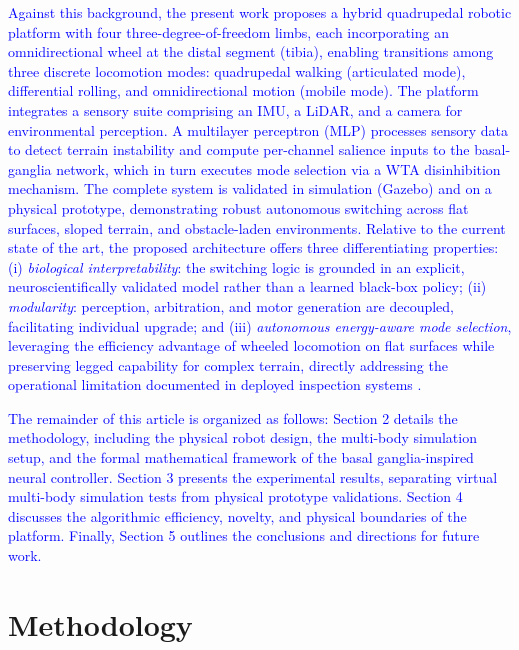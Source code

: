 \documentclass[preprint,12pt]{elsarticle}
\newcommand{\revblue}[1]{\textcolor{blue}{#1}}
\begin{document}
\revblue{Against this background, the present work proposes a hybrid quadrupedal robotic platform with four three-degree-of-freedom limbs, each incorporating an omnidirectional wheel at the distal segment (tibia), enabling transitions among three discrete locomotion modes: quadrupedal walking (articulated mode), differential rolling, and omnidirectional motion (mobile mode). The platform integrates a sensory suite comprising an IMU, a LiDAR, and a camera for environmental perception. A multilayer perceptron (MLP) processes sensory data to detect terrain instability and compute per-channel salience inputs to the basal-ganglia network, which in turn executes mode selection via a WTA disinhibition mechanism. The complete system is validated in simulation (Gazebo) and on a physical prototype, demonstrating robust autonomous switching across flat surfaces, sloped terrain, and obstacle-laden environments. Relative to the current state of the art, the proposed architecture offers three differentiating properties: (i) \emph{biological interpretability}: the switching logic is grounded in an explicit, neuroscientifically validated model rather than a learned black-box policy; (ii) \emph{modularity}: perception, arbitration, and motor generation are decoupled, facilitating individual upgrade; and (iii) \emph{autonomous energy-aware mode selection}, leveraging the efficiency advantage of wheeled locomotion on flat surfaces while preserving legged capability for complex terrain, directly addressing the operational limitation documented in deployed inspection systems \citep{Hutter2017ANYmal,Tranzatto2022CERBERUS}.}

\revblue{The remainder of this article is organized as follows: Section 2 details the methodology, including the physical robot design, the multi-body simulation setup, and the formal mathematical framework of the basal ganglia-inspired neural controller. Section 3 presents the experimental results, separating virtual multi-body simulation tests from physical prototype validations. Section 4 discusses the algorithmic efficiency, novelty, and physical boundaries of the platform. Finally, Section 5 outlines the conclusions and directions for future work.}


\section{Methodology}
\end{document}

